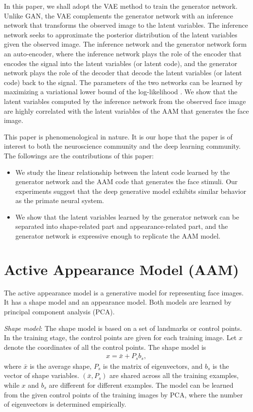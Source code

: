 \documentclass{article}
\begin{document}
In this paper, we shall adopt the VAE method to train the generator network. Unlike GAN, the VAE complements the generator network with an inference network that transforms the observed image to the latent variables. The inference network seeks to approximate the posterior distribution of the latent variables given the observed image. The inference network and the generator network form an auto-encoder, where the inference network plays the role of the encoder that encodes the signal into the latent variables (or latent code), and the generator network plays the role of the decoder that decode the latent variables (or latent code) back to the signal. The parameters of the two networks can be learned by maximizing a variational lower bound of the log-likelihood \cite{blei2017variational}. We show that the latent variables computed by the inference network from the observed face image are highly correlated with the latent variables of the AAM that generates the face image.


 This paper is phenomenological in nature. It is our hope that the paper is of interest to both the neuroscience community and the deep learning community.  The followings are the contributions of this paper:
\begin{itemize}
\item We study the linear relationship between the latent code learned by the generator network and the AAM code that generates the face stimuli. Our experiments suggest that the deep generative model exhibits similar behavior as the primate neural system.
\item We show that the latent variables learned by the generator network can be separated into shape-related part and appearance-related part, and the generator network is expressive enough to replicate the AAM model.
\end{itemize}

\section{Active Appearance Model (AAM)}\label{sec:AAM} %

The active appearance model \cite{cootes2001active,cootes2015active} is a generative model for representing face images. It has a shape model and an appearance model. Both models are learned by principal component analysis (PCA).

\textit{Shape model}: The shape model is based on a set of landmarks or control points. In the training stage, the control points are given for each training image.  Let $x$ denote the coordinates of all the control points. The shape model is
\begin{eqnarray}
\label{eqn1}
x = \bar{x} + P_s b_s,
\end{eqnarray}
where $\bar{x}$ is the average shape, $P_s$ is the matrix of eigenvectors, and $b_s$ is the vector of shape variables. $(\bar{x}, P_s)$ are shared across all the training examples, while $x$ and $b_s$ are different for different examples. The model can be learned from the given control points of the training images by PCA, where the number of eigenvectors is determined empirically.
\end{document}
